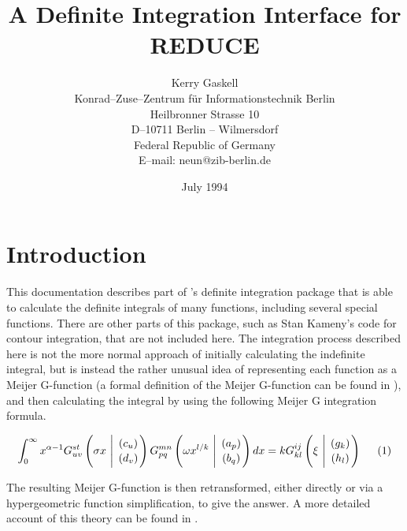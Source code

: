 \date{July 1994}
\title{A Definite Integration Interface for REDUCE}
\author{Kerry Gaskell \\
Konrad--Zuse--Zentrum f\"ur Informationstechnik Berlin\\
Heilbronner Strasse 10 \\
D--10711 Berlin -- Wilmersdorf \\
Federal Republic of Germany \\[0.05in]
E--mail: neun@zib-berlin.de\footnotemark[1]}


\maketitle
{}

\section{Introduction}
This documentation describes part of \REDUCE's definite
integration package that is able to calculate the definite integrals of
many functions, including several special functions.  There are other
parts of this package, such as Stan Kameny's code for contour integration,
that are not included here.  The integration process described here is not
the more normal approach of initially calculating the indefinite integral,
but is instead the rather unusual idea of representing each function as a
Meijer G-function (a formal definition of the Meijer G-function can be
found in \cite {Prudnikov}), and then calculating the integral by using
the following Meijer G integration formula.

\begin{displaymath}
\int_{0}^{\infty} x^{\alpha-1} G^{s t}_{u v}
\left( \sigma x \  \Bigg\vert \  {( c_u) \atop (d_v)} \right)
G^{m n}_{p q} \left( \omega x^{l/k} \  \Bigg\vert \ {(a_p) \atop (b_q)}
\right) dx = k G^{i j}_{k l} \left( \xi \ \Bigg\vert \
{(g_k) \atop (h_l)} \right)  \hspace{5mm} (1)
\end{displaymath}

The resulting Meijer G-function is then retransformed, either directly
or via a hypergeometric function simplification, to give
the answer. A more detailed account of this theory can be found in
\cite {Adamchik:90}.

